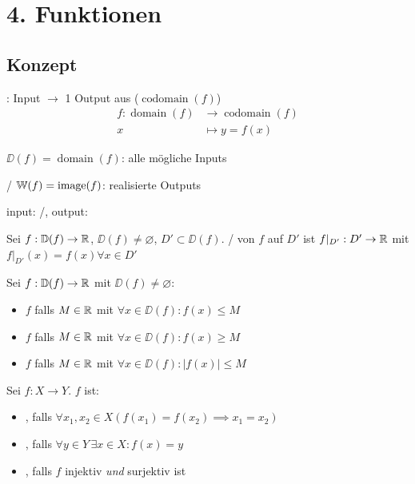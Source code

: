 \section{4. Funktionen}

\subsection{Konzept}

\Def {}: Input $\to$ 1 Output aus  ($\operatorname{codomain}(f)$)
\begin{align*}
    f: \operatorname{domain}(f) & \to \operatorname{codomain}(f) \\
    x & \mapsto y = f(x)
\end{align*}

\Def {} $\DD(f) = \operatorname{domain}(f)$: alle mögliche Inputs

\Def {}/ $\mathbb{W}(f) = \operatorname{image}(f)$: realisierte Outputs

\Def input: /, output: 

\Def Sei $f: \mathbb{D}(f) \to \mathbb{R}$, $\DD(f)\ne \varnothing$, $D' \subset \DD(f)$.
/ von $f$ auf $D'$ ist $f\rvert_{D'} : D' \to \mathbb{R}$
mit $f\rvert_{D'}(x) = f(x) \forall x \in D'$

\Def Sei $f : \mathbb{D}(f) \to \mathbb{R}$ mit $\DD(f)\ne \varnothing$:
\vspace{-0.6em}
\begin{itemize}
    \item $f$  falls $M \in \mathbb{R}$ mit $\forall x \in \DD(f) : f(x)\le M$
    \item $f$  falls $M \in \mathbb{R}$ mit $\forall x \in \DD(f) : f(x)\ge M$
    \item $f$  falls $M \in \mathbb{R}$ mit $\forall x \in \DD(f) : |f(x)|\le M$
\end{itemize}

\Def Sei $f : X \to Y$. $f$ ist:
\vspace{-0.6em}
\begin{itemize}
    \item {}, falls $\forall x_1, x_2 \in X (f(x_1) = f(x_2) \implies x_1 = x_2)$
    \item {}, falls $\forall y \in Y \, \exists x \in X : f(x) = y$
    \item {}, falls $f$ injektiv \textit{und} surjektiv ist
\end{itemize}

